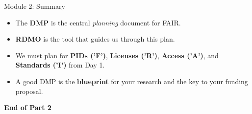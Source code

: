 \begin{frame}{Module 2: Summary}
    \begin{itemize}
        \item The \textbf{DMP} is the central \emph{planning} document for FAIR.
        \item \textbf{RDMO} is the tool that guides us through this plan.
        \item We must plan for \textbf{PIDs ('F')}, \textbf{Licenses ('R')}, \textbf{Access ('A')}, and \textbf{Standards ('I')} from Day 1.
        \item A good DMP is the \textbf{blueprint} for your research and the key to your funding proposal.
    \end{itemize}
    \vfill
    \begin{center}
        \textbf{End of Part 2}
    \end{center}
\end{frame}